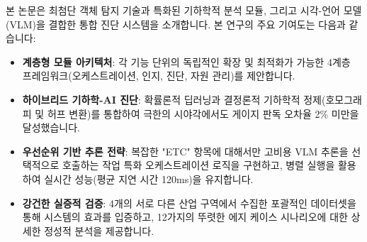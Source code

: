 본 논문은 최첨단 객체 탐지 기술과 특화된 기하학적 분석 모듈, 그리고 시각-언어 모델(VLM)을 결합한 통합 진단 시스템을 소개합니다.
본 연구의 주요 기여도는 다음과 같습니다:
\begin{itemize}
    \item \textbf{계층형 모듈 아키텍처}: 각 기능 단위의 독립적인 확장 및 최적화가 가능한 4계층 프레임워크(오케스트레이션, 인지, 진단, 자원 관리)를 제안합니다.
    \item \textbf{하이브리드 기하학-AI 진단}: 확률론적 딥러닝과 결정론적 기하학적 정제(호모그래피 및 허프 변환)를 통합하여 극한의 시야각에서도 게이지 판독 오차율 2\% 미만을 달성했습니다.
    \item \textbf{우선순위 기반 추론 전략}: 복잡한 "ETC" 항목에 대해서만 고비용 VLM 추론을 선택적으로 호출하는 작업 특화 오케스트레이션 로직을 구현하고, 병렬 실행을 활용하여 실시간 성능(평균 지연 시간 120ms)을 유지합니다.
    \item \textbf{강건한 실증적 검증}: 4개의 서로 다른 산업 구역에서 수집한 포괄적인 데이터셋을 통해 시스템의 효과를 입증하고, 12가지의 뚜렷한 에지 케이스 시나리오에 대한 상세한 정성적 분석을 제공합니다.
\end{itemize}
